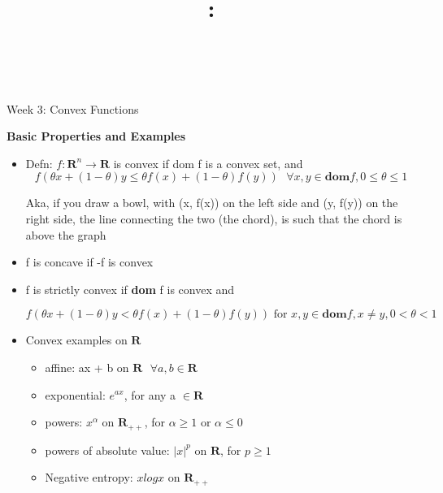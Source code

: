 \documentclass{article}
\title{
\vspace{2in}
\textmd{\textbf{\hmwkClass:}\\
\textmd{\hmwkTitle}}\\
\vspace{3in}
}
\author{\textbf{\hmwkAuthorName}}
\begin{document}
\maketitle



\newpage
\begin{homeworkProblemName}{{\LARGE Week 3: Convex Functions}}

  \vspace{0.2 cm} \textbf{{\large Basic Properties and Examples}}

  \begin{problemAnswer}{
      \begin{itemize}
      \item Defn: $f: \bm{R}^n \rightarrow \bm{R}$ is convex if dom f is a convex set, and
        $$f(\theta x + (1 - \theta)y \leq \theta f(x) + (1 - \theta) f(y)) \text{ } \forall x, y \in \textbf{dom}
        f, 0 \leq \theta \leq 1 $$

        Aka, if you draw a bowl, with (x, f(x)) on the left side and (y, f(y))
        on the right side, the line connecting the two (the chord), is such that
        the chord is above the graph

      \item f is concave if -f is convex

      \item f is strictly convex if \textbf{dom} f is convex and

        $$ f(\theta x + (1 - \theta )y < \theta f(x) + (1 - \theta) f(y)) \text{ for }  x, y \in \textbf{dom}
        f, x \neq y,  0 < \theta < 1 $$


      \item Convex examples on $\bm{R}$
        \begin{itemize}
        \item affine: ax + b on $\bm{R} \text{ }\forall a, b \in \bm{R}$
        \item exponential: $e^{ax}$, for any a $\in \bm{R}$
        \item powers: $x^{\alpha}$ on $\bm{R}_{++}$, for $\alpha \geq 1 \text{ or } \alpha \leq 0$
        \item powers of absolute value: $|x|^{p}$ on $\bm{R}$, for $p \geq 1$
        \item Negative entropy: $x log x$ on $\bm{R}_{++}$
        \end{itemize}


\end{itemize}}
\end{problemAnswer}
\end{homeworkProblemName}
\end{document}
